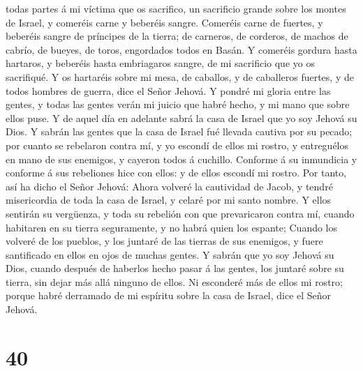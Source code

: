 todas partes á mi víctima que os sacrifico, un sacrificio grande sobre
los montes de Israel, y comeréis carne y beberéis sangre.
 Comeréis carne de fuertes, y beberéis sangre de
príncipes de la tierra; de carneros, de corderos, de machos de cabrío,
de bueyes, de toros, engordados todos en Basán.  Y
comeréis gordura hasta hartaros, y beberéis hasta embriagaros sangre, de
mi sacrificio que yo os sacrifiqué.  Y os hartaréis sobre
mi mesa, de caballos, y de caballeros fuertes, y de todos hombres de
guerra, dice el Señor Jehová.  Y pondré mi gloria entre
las gentes, y todas las gentes verán mi juicio que habré hecho, y mi
mano que sobre ellos puse.  Y de aquel día en adelante
sabrá la casa de Israel que yo soy Jehová su Dios.  Y
sabrán las gentes que la casa de Israel fué llevada cautiva por su
pecado; por cuanto se rebelaron contra mí, y yo escondí de ellos mi
rostro, y entreguélos en mano de sus enemigos, y cayeron todos á
cuchillo.  Conforme á su inmundicia y conforme á sus
rebeliones hice con ellos: y de ellos escondí mi rostro. 
Por tanto, así ha dicho el Señor Jehová: Ahora volveré la cautividad de
Jacob, y tendré misericordia de toda la casa de Israel, y celaré por mi
santo nombre.  Y ellos sentirán su vergüenza, y toda su
rebelión con que prevaricaron contra mí, cuando habitaren en su tierra
seguramente, y no habrá quien los espante;  Cuando los
volveré de los pueblos, y los juntaré de las tierras de sus enemigos, y
fuere santificado en ellos en ojos de muchas gentes.  Y
sabrán que yo soy Jehová su Dios, cuando después de haberlos hecho pasar
á las gentes, los juntaré sobre su tierra, sin dejar más allá ninguno de
ellos.  Ni esconderé más de ellos mi rostro; porque habré
derramado de mi espíritu sobre la casa de Israel, dice el Señor Jehová.

\hypertarget{section-39}{%
\section{40}\label{section-39}}

